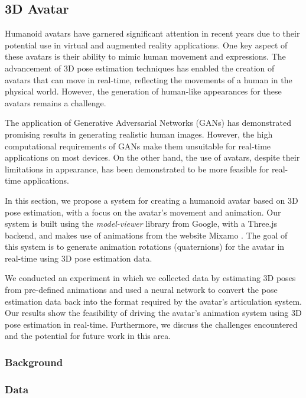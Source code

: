 \subsection{3D Avatar}

Humanoid avatars have garnered significant attention in recent years due to their potential use in virtual and augmented reality applications.
One key aspect of these avatars is their ability to mimic human movement and expressions.
The advancement of 3D pose estimation techniques has enabled the creation of avatars that can move in real-time,
reflecting the movements of a human in the physical world.
However, the generation of human-like appearances for these avatars remains a challenge.


The application of Generative Adversarial Networks (GANs) has demonstrated promising results in generating realistic human images.
However, the high computational requirements of GANs make them unsuitable for real-time applications on most devices.
On the other hand, the use of avatars, despite their limitations in appearance, has been demonstrated to be more feasible for real-time applications.

In this section, we propose a system for creating a humanoid avatar based on 3D pose estimation, with a focus on the avatar's movement and animation.
Our system is built using the \emph{model-viewer}  library from Google, with a Three.js  backend,
and makes use of animations from the website Mixamo .
The goal of this system is to generate animation rotations (quaternions) for the avatar in real-time using 3D pose estimation data.

We conducted an experiment in which we collected data by estimating 3D poses from pre-defined animations
and used a neural network to convert the pose estimation data back into the format required by the avatar's articulation system.
Our results show the feasibility of driving the avatar's animation system using 3D pose estimation in real-time.
Furthermore, we discuss the challenges encountered and the potential for future work in this area.

\subsubsection{Background}


\subsubsection{Data}

